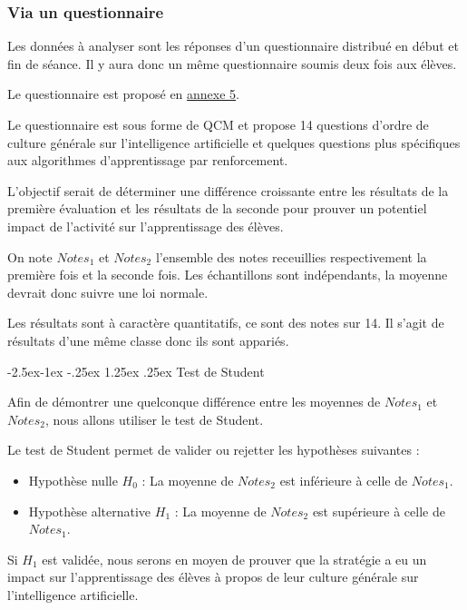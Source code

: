 \documentclass[
12pt,
french,
]{article}
\makeatletter
\renewcommand\paragraph{\@startsection{paragraph}{4}{\z@}%
        {-2.5ex\@plus -1ex \@minus -.25ex}%
        {1.25ex \@plus .25ex}%
        {\normalfont\normalsize\bfseries}}
\makeatother
\begin{document}
\hypertarget{via-un-questionnaire}{%
\subsubsection{Via un questionnaire}\label{via-un-questionnaire}}

Les données à analyser sont les réponses d'un questionnaire distribué en
début et fin de séance. Il y aura donc un même questionnaire soumis deux
fois aux élèves.

Le questionnaire est proposé en \hyperref[sec:annexe5]{annexe 5}.

Le questionnaire est sous forme de QCM et propose 14 questions d'ordre
de culture générale sur l'intelligence artificielle et quelques
questions plus spécifiques aux algorithmes d'apprentissage par
renforcement.

L'objectif serait de déterminer une différence croissante entre les
résultats de la première évaluation et les résultats de la seconde pour
prouver un potentiel impact de l'activité sur l'apprentissage des
élèves.

On note \(Notes_1\) et \(Notes_2\) l'ensemble des notes receuillies
respectivement la première fois et la seconde fois. Les échantillons
sont indépendants, la moyenne devrait donc suivre une loi normale.

Les résultats sont à caractère quantitatifs, ce sont des notes sur 14.
Il s'agit de résultats d'une même classe donc ils sont appariés.

\hypertarget{test-de-student}{%
\paragraph{Test de Student}\label{test-de-student}}

Afin de démontrer une quelconque différence entre les moyennes de
\(Notes_1\) et \(Notes_2\), nous allons utiliser le test de Student.

Le test de Student permet de valider ou rejetter les hypothèses
suivantes :

\begin{itemize}
\item
  Hypothèse nulle \(H_0\) : La moyenne de \(Notes_2\) est inférieure à
  celle de \(Notes_1\).
\item
  Hypothèse alternative \(H_1\) : La moyenne de \(Notes_2\) est
  supérieure à celle de \(Notes_1\).
\end{itemize}

Si \(H_1\) est validée, nous serons en moyen de prouver que la stratégie
a eu un impact sur l'apprentissage des élèves à propos de leur culture
générale sur l'intelligence artificielle.
\end{document}
